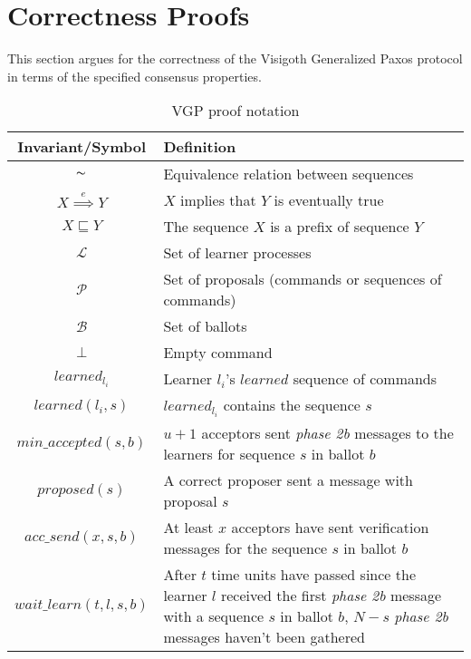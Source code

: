 \section{Correctness Proofs} \label{vft_proofs}

This section argues for the correctness of the Visigoth Generalized Paxos protocol in terms of the specified consensus properties.\par


\begin{table}[h!]
	\renewcommand{\arraystretch}{1.5}
	\centering
	\begin{tabularx}{\linewidth}{ |c|X|}
		\hline
		Invariant/Symbol & Definition \\
		\hline
		$\thicksim$ & Equivalence relation between sequences \\
		\hline
		$X \overset{e}{\implies} Y$ & $X$ implies that $Y$ is eventually true \\
		\hline
		$X \sqsubseteq Y$ & The sequence $X$ is a prefix of sequence $Y$ \\
		\hline
		$\mathcal{L}$ & Set of learner processes \\
		\hline
		$\mathcal{P}$ & Set of proposals (commands or sequences of commands) \\
		\hline
		$\mathcal{B}$ & Set of ballots \\
		\hline
		$\bot$ & Empty command \\
		\hline
		$learned_{l_i}$ & Learner $l_i$'s $learned$ sequence of commands \\
		\hline
		$learned(l_i,s)$ & $learned_{l_i}$ contains the sequence $s$ \\
		\hline
		$min\_accepted(s,b)$ & $u+1$ acceptors sent \textit{phase 2b} messages to the learners for sequence $s$ in ballot $b$\\
		\hline
		$proposed(s)$ & A correct proposer sent a message with proposal $s$ \\
		\hline
		$acc\_send(x,s,b)$ & At least $x$ acceptors have sent verification messages for the sequence $s$ in ballot $b$\\
		\hline
		$wait\_learn(t,l,s,b)$ & After $t$ time units have passed since the learner $l$ received the first \textit{phase 2b} message with a sequence $s$ in ballot $b$, $N-s$ \textit{phase 2b} messages haven't been gathered\\
		\hline
  	\end{tabularx} 
	\caption{VGP proof notation} 
	\label{table:vft_proof}
\end{table}


